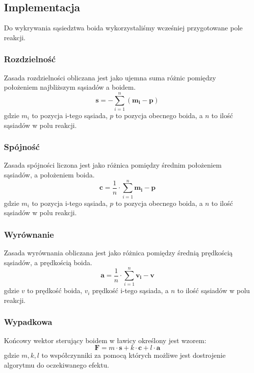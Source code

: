 \documentclass{article}
\renewcommand{\vec}[1]{\mathbf{#1}}
\begin{document}
\subsection{Implementacja}
Do wykrywania sąsiedztwa boida wykorzystaliśmy wcześniej przygotowane pole reakcji.
\subsubsection{Rozdzielność}
Zasada rozdzielności obliczana jest jako ujemna suma różnic pomiędzy położeniem najbliższym sąsiadów a boidem.
\begin{equation}
    \vec{s} = - \sum\limits_{i=1}^n( \vec{m_i} - \vec{p})
\end{equation}
gdzie \(m_i\) to pozycja i-tego sąsiada, \(p\) to pozycja obecnego boida, a \(n\) to ilość sąsiadów w polu reakcji.
\subsubsection{Spójność}
Zasada spójności liczona jest jako różnica pomiędzy średnim położeniem sąsiadów, a położeniem boida.
\begin{equation}
    \vec{c} = \frac{1}{n} \cdot \sum\limits_{i=1}^n \vec{m_i} - \vec{p}
\end{equation}
gdzie \(m_i\) to pozycja i-tego sąsiada, \(p\) to pozycja obecnego boida, a \(n\) to ilość sąsiadów w polu reakcji.
\subsubsection{Wyrównanie}
Zasada wyrównania obliczana jest jako różnica pomiędzy średnią prędkością sąsiadów,  a prędkością boida.
\begin{equation}
    \vec{a} = \frac{1}{n}\cdot\sum\limits_{i=1}^{n}\vec{v_i} - \vec{v}
\end{equation}
gdzie \(v\) to prędkość boida, \(v_i\) prędkość i-tego sąsiada, a \(n\) to ilość sąsiadów w polu reakcji.
\subsubsection{Wypadkowa}
Końcowy wektor sterujący boidem w ławicy określony jest wzorem:
\begin{equation}
    \vec{F} = m\cdot\vec{s} + k\cdot\vec{c} + l\cdot\vec{a}
\end{equation}
gdzie \(m, k, l\) to współczynniki za pomocą których możliwe jest dostrojenie algorytmu do oczekiwanego efektu.
\end{document}

